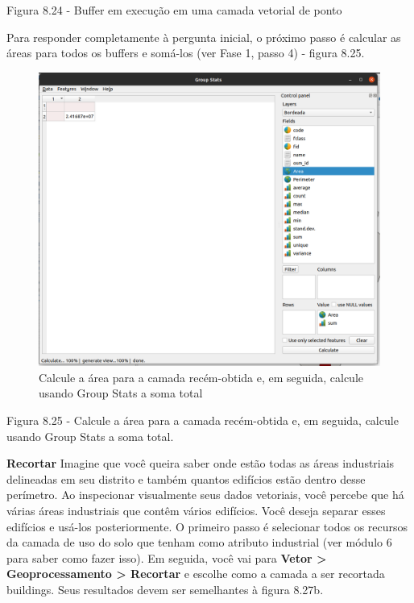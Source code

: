 \documentclass[
]{krantz}
\begin{document}
Figura 8.24 - Buffer em execução em uma camada vetorial de ponto

Para responder completamente à pergunta inicial, o próximo passo é calcular as áreas para todos os buffers e somá-los (ver Fase 1, passo 4) - figura 8.25.

\begin{figure}
\centering
\includegraphics{media/modulo8/fig825.png}
\caption{Calcule a área para a camada recém-obtida e, em seguida, calcule usando Group Stats a soma total}
\end{figure}

Figura 8.25 - Calcule a área para a camada recém-obtida e, em seguida, calcule usando Group Stats a soma total.

\textbf{Recortar} Imagine que você queira saber onde estão todas as áreas industriais delineadas em seu distrito e também quantos edifícios estão dentro desse perímetro. Ao inspecionar visualmente seus dados vetoriais, você percebe que há várias áreas industriais que contêm vários edifícios. Você deseja separar esses edifícios e usá-los posteriormente. O primeiro passo é selecionar todos os recursos da camada de uso do solo que tenham como atributo industrial (ver módulo 6 para saber como fazer isso). Em seguida, você vai para \textbf{Vetor \textgreater{} Geoprocessamento \textgreater{} Recortar} e escolhe como a camada a ser recortada buildings. Seus resultados devem ser semelhantes à figura 8.27b.
\end{document}

